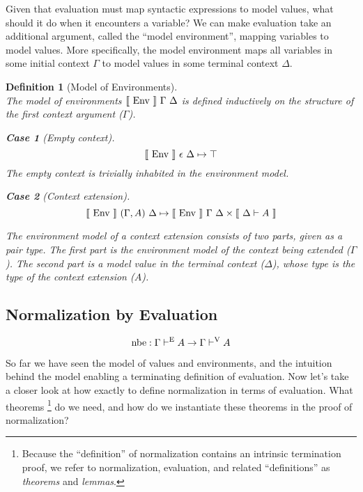 \documentclass{llncs}
\newtheorem{defin}{Definition}
\newtheorem{subdefin}{Case}
\def\cross{\times}
\def\dfn{\mapsto}
\def\marr{\rightarrow}
\def\emp{\epsilon}
\newcommand{\turn}[1]{\vdash^\con{#1}}
\newcommand{\el}[1]{\llbracket ~ #1 ~ \rrbracket}
\newcommand{\con}[1]{\textmd{#1}}
\newcommand{\fun}[1]{\textmd{#1}}
\newcommand{\dtypm}[1]{\el{\Delta \vdash #1}}
\newcommand{\type}[1]{\Gamma \turn{E} #1}
\newcommand{\typv}[1]{\Gamma \turn{V} #1}
\def\menv{\el{\fun{Env}}~\Gamma~\Delta}
\newcommand{\dmenv}[1]{\el{\fun{Env}}~#1~\Delta}
\begin{document}
Given that evaluation must map syntactic expressions to model values,
what should it do when it encounters a variable? We can make
evaluation take an additional argument, called the
``model environment'', mapping variables to model values. More
specifically, the model environment maps all variables in
some initial context $\Gamma$ to model values in some terminal context
$\Delta$.


\begin{defin}[Model of Environments]
\label{def:menv}
$ $\\
The model of environments $\menv$ is defined inductively on the structure
of the first context argument ($\Gamma$).

\begin{subdefin}[Empty context]
$$
\dmenv{\emp} \dfn \top
$$
The empty context is trivially inhabited in the environment model.
\end{subdefin}

\begin{subdefin}[Context extension]
$$
\dmenv{(\Gamma, A)} \dfn \dmenv{\Gamma} \cross \dtypm{A}
$$

The environment model of a context extension consists of two parts,
given as a pair type. The first part
is the environment model of the context being extended ($\Gamma$). The second part
is a model value in the terminal context ($\Delta$),
whose type is the type of the context extension ($A$).

\end{subdefin}

\end{defin}

\subsection{Normalization by Evaluation}

$$
\fun{nbe} : \type{A} \marr \typv{A}
$$

So far we have seen the model of values and environments, and the
intuition behind the model enabling a terminating definition of evaluation.
Now let's take a closer look at how exactly to define normalization in
terms of evaluation. What theorems 
\footnote{Because the ``definition'' of normalization contains an
intrinsic termination proof, we refer to normalization, evaluation, and
related ``definitions'' as \textit{theorems} and \textit{lemmas}.}
do we need, and how do we instantiate these theorems in the proof of
normalization?
\end{document}

